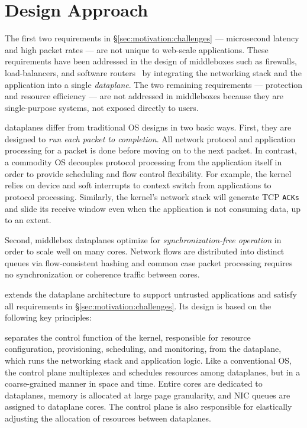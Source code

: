 \section{\ix Design Approach}
\label{sec:design}

The first two requirements in \S\ref{sec:motivation:challenges} ---
microsecond latency and high packet rates --- are not unique to
web-scale applications. These requirements have been addressed in the
design of middleboxes such as firewalls, load-balancers, and software
routers~\cite{routebricks,click} by integrating the networking stack
and the application into a single \emph{dataplane}. The two remaining
requirements --- protection and resource efficiency --- are not
addressed in middleboxes because they are single-purpose systems, not
exposed directly to users.

 dataplanes differ from traditional OS designs in two basic
ways. First, they are designed to \emph{run each packet to
  completion}.  All network protocol and application processing for a
packet is done before moving on to the next packet.    
In contrast, a
commodity OS decouples protocol processing from the application itself
in order to provide scheduling and flow control flexibility.  For
example, the kernel relies on device and soft interrupts to context
switch from applications to protocol processing. Similarly, the
kernel's network stack will generate TCP \texttt{ACKs} and slide its
receive window even when the application is not consuming data, up to
an extent. 

Second, middlebox dataplanes optimize for \emph{synchronization-free
  operation} in order to scale well on many cores. Network flows are
distributed into distinct queues via flow-consistent hashing and common case packet processing requires no
synchronization or coherence traffic between cores.

\ix extends the dataplane architecture to support untrusted
applications and satisfy all requirements in
\S\ref{sec:motivation:challenges}. Its design is based on the
following key principles:


 \ix
separates the control function of the kernel, responsible for resource
configuration, provisioning, scheduling, and monitoring, from the
dataplane, which runs the networking stack and application logic.
Like a conventional OS, the control plane multiplexes and schedules
resources among dataplanes, but in a coarse-grained manner in space
and time. Entire cores are dedicated to dataplanes, memory is
allocated at large page granularity, and NIC queues are assigned to
dataplane cores. The control plane is also responsible for elastically
adjusting the allocation of resources between dataplanes.

